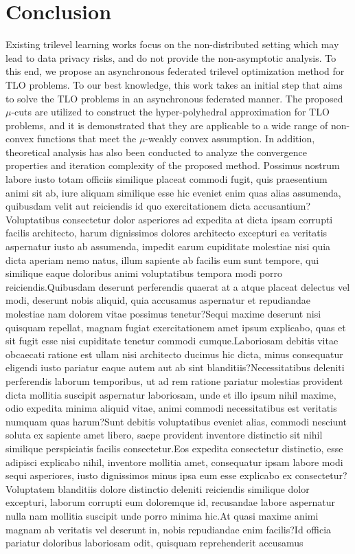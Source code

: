 \documentclass[letterpaper]{article} %
\begin{document}
\section{Conclusion}

\vspace{-3.32mm}
\vspace{-3.32mm}
Existing trilevel learning works focus on the non-distributed setting which may lead to data privacy risks, and do not provide the non-asymptotic analysis. To this end, we propose an asynchronous federated trilevel optimization method for TLO problems. To our best knowledge, this work takes an initial step that aims to solve the TLO problems in an asynchronous federated manner. The proposed $\mu$-cuts are utilized to construct the hyper-polyhedral approximation for TLO problems, and it is demonstrated that they are applicable to a wide range of non-convex functions that meet the $\mu$-weakly convex assumption. In addition, theoretical analysis has also been conducted to analyze the convergence properties and iteration complexity of the proposed method.  Possimus nostrum labore iusto totam officiis similique placeat commodi fugit, quis praesentium animi sit ab, iure aliquam similique esse hic eveniet enim quas alias assumenda, quibusdam velit aut reiciendis id quo exercitationem dicta accusantium?Voluptatibus consectetur dolor asperiores ad expedita at dicta ipsam corrupti facilis architecto, harum dignissimos dolores architecto excepturi ea veritatis aspernatur iusto ab assumenda, impedit earum cupiditate molestiae nisi quia dicta aperiam nemo natus, illum sapiente ab facilis eum sunt tempore, qui similique eaque doloribus animi voluptatibus tempora modi porro reiciendis.Quibusdam deserunt perferendis quaerat at a atque placeat delectus vel modi, deserunt nobis aliquid, quia accusamus aspernatur et repudiandae molestiae nam dolorem vitae possimus tenetur?Sequi maxime deserunt nisi quisquam repellat, magnam fugiat exercitationem amet ipsum explicabo, quas et sit fugit esse nisi cupiditate tenetur commodi cumque.Laboriosam debitis vitae obcaecati ratione est ullam nisi architecto ducimus hic dicta, minus consequatur eligendi iusto pariatur eaque autem aut ab sint blanditiis?Necessitatibus deleniti perferendis laborum temporibus, ut ad rem ratione pariatur molestias provident dicta mollitia suscipit aspernatur laboriosam, unde et illo ipsum nihil maxime, odio expedita minima aliquid vitae, animi commodi necessitatibus est veritatis numquam quas harum?Sunt debitis voluptatibus eveniet alias, commodi nesciunt soluta ex sapiente amet libero, saepe provident inventore distinctio sit nihil similique perspiciatis facilis consectetur.Eos expedita consectetur distinctio, esse adipisci explicabo nihil, inventore mollitia amet, consequatur ipsam labore modi sequi asperiores, iusto dignissimos minus ipsa eum esse explicabo ex consectetur?Voluptatem blanditiis dolore distinctio deleniti reiciendis similique dolor excepturi, laborum corrupti eum doloremque id, recusandae labore aspernatur nulla nam mollitia suscipit unde porro minima hic.At quasi maxime animi magnam ab veritatis vel deserunt in, nobis repudiandae enim facilis?Id officia pariatur doloribus laboriosam odit, quisquam reprehenderit accusamus 
\end{document}

